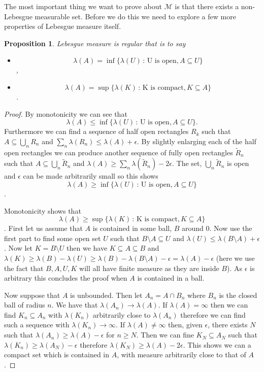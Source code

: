 \documentclass[
]{book}
\providecommand{\tightlist}{%
  \setlength{\itemsep}{0pt}\setlength{\parskip}{0pt}}
\newtheorem{proposition}{Proposition}[chapter]
\theoremstyle{definition}
\theoremstyle{definition}
\theoremstyle{definition}
\theoremstyle{definition}
\theoremstyle{remark}
\begin{document}
The most important thing we want to prove about \(\mathscr{M}\) is that there exists a non-Lebesgue measurable set. Before we do this we need to explore a few more properties of Lebesgue measure itself.

\begin{proposition}

Lebesgue measure is \emph{regular} that is to say

\begin{itemize}
\tightlist
\item
  \[\lambda(A) = \inf \{ \lambda(U)\,:\, \mbox{U is open}, A \subseteq U\}\],
\item
  \[\lambda(A) = \sup \{ \lambda(K)\,:\, \mbox{K is compact}, K \subseteq A\}\].
\end{itemize}

\end{proposition}

\begin{proof}
By monotonicity we can see that \[\lambda(A) \leq \inf \{ \lambda(U)\,:\, \mbox{U is open}, A \subseteq U\}.\]
Furthermore we can find a sequence of half open rectangles \(R_k\) such that \(A \subseteq \bigcup_n R_n\) and \(\sum_n \lambda(R_n) \leq \lambda(A) + \epsilon\). By slightly enlarging each of the half open rectangles we can produce another sequence of fully open rectangles \(\tilde{R}_n\) such that \(A \subseteq \bigcup_n \tilde{R}_n\) and \(\lambda(A) \geq \sum_n \lambda(\tilde{R}_n)-2\epsilon\). The set, \(\bigcup_n \tilde{R}_n\) is open and \(\epsilon\) can be made arbitrarily small so this shows \[\lambda(A) \geq \inf \{ \lambda(U)\,:\, \mbox{U is open}, A \subseteq U\}\].

Monotonicity shows that \[\lambda(A) \geq \sup \{ \lambda(K)\,:\, \mbox{K is compact}, K \subseteq A\}\]. First let us assume that \(A\) is contained in some ball, \(B\) around 0. Now use the first part to find some open set \(U\) such that \(B \setminus A \subseteq U\) and \(\lambda(U) \leq \lambda(B \setminus A) + \epsilon\). Now let \(K = B \setminus U\) then we have \(K \subseteq A \subseteq B\) and \(\lambda(K) \geq \lambda(B) - \lambda(U) \geq \lambda(B) - \lambda(B \setminus A) - \epsilon = \lambda(A) - \epsilon\) (here we use the fact that \(B, A, U, K\) will all have finite measure as they are inside \(B\)). As \(\epsilon\) is arbitrary this concludes the proof when \(A\) is contained in a ball.

Now suppose that \(A\) is unbounded. Then let \(A_n = A \cap B_n\) where \(B_n\) is the closed ball of radius \(n\). We have that \(\lambda(A_n) \rightarrow \lambda(A)\). If \(\lambda(A) = \infty\) then we can find \(K_n \subseteq A_n\) with \(\lambda(K_n)\) arbitrarily close to \(\lambda(A_n)\) therefore we can find such a sequence with \(\lambda(K_n) \rightarrow \infty\). If \(\lambda(A) \neq \infty\) then, given \(\epsilon\), there exists \(N\) such that \(\lambda(A_n) \geq \lambda(A)-\epsilon\) for \(n \geq N\). Then we can fine \(K_N \subseteq A_N\) such that \(\lambda(K_n) \geq \lambda(A_N) - \epsilon\) therefore \(\lambda(K_N) \geq \lambda(A)- 2 \epsilon\). This shows we can a compact set which is contained in \(A\), with measure arbitrarily close to that of \(A\).
\end{proof}
\end{document}
